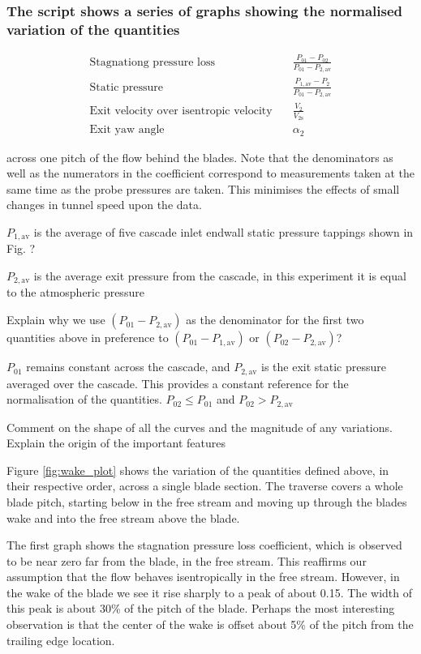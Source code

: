 \documentclass{article}
\begin{document}
\subsubsection{The script shows a series of graphs showing the normalised variation of the quantities
}

\begin{align*}
    \text{Stagnationg pressure loss} \quad & \frac{P_{01} - P_{02}}{P_{01} - P_{2,\text{av}}} \\
    \text{Static pressure} \quad & \frac{P_{1,\text{av}} - P_2}{P_{01} - P_{2,\text{av}}} \\
    \text{Exit velocity over isentropic velocity} \quad & \frac{V_2}{V_{2\text{s}}} \\
    \text{Exit yaw angle} \quad & \alpha_2
\end{align*}

across one pitch of the flow behind the blades. Note that the denominators as well as the
numerators in the coefficient correspond to measurements taken at the same time as the probe
pressures are taken. This minimises the effects of small changes in tunnel speed upon the data.

$P_{1,\text{av}}$ is the average of five cascade inlet endwall static pressure tappings shown in Fig. ?

$P_{2,\text{av}}$ is the average exit pressure from the cascade, in this experiment it is equal to the
atmospheric pressure


Explain why we use $(P_{01} - P_{2,\text{av}})$ as the denominator for the first two quantities above in
preference to $(P_{01} - P_{1,\text{av}})$ or $(P_{02} - P_{2,\text{av}})$?

$P_{01}$ remains constant across the cascade, and $P_{2,\text{av}}$ is the exit static pressure averaged over the cascade.
This provides a constant reference for the normalisation of the quantities.
$ P_{02} \le P_{01} $ and $P_{02} > P_{2,\text{av}}$  %


Comment on the shape of all the curves and the magnitude of any variations. Explain the origin
of the important features

Figure \ref{fig:wake_plot} shows the variation of the quantities defined above, in their respective order, across a single blade section.
The traverse covers a whole blade pitch, starting below in the free stream and moving up through the blades wake and into the free stream above the blade.

The first graph shows the stagnation pressure loss coefficient, which is observed to be near zero far from the blade, in the free stream.
This reaffirms our assumption that the flow behaves isentropically in the free stream.
However, in the wake of the blade we see it rise sharply to a peak of about 0.15.
The width of this peak is about 30\% of the pitch of the blade.
Perhaps the most interesting observation is that the center of the wake is offset about 5\% of the pitch from the trailing edge location.
\end{document}
